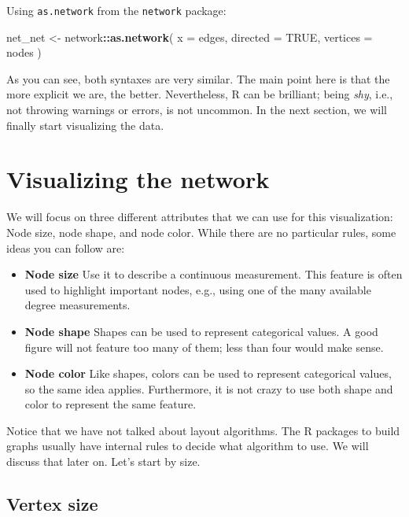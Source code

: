 \documentclass[]{book}
\newenvironment{Shaded}{\begin{snugshade}}{\end{snugshade}}
\newcommand{\DataTypeTok}[1]{\textcolor[rgb]{0.13,0.29,0.53}{#1}}
\newcommand{\KeywordTok}[1]{\textcolor[rgb]{0.13,0.29,0.53}{\textbf{#1}}}
\newcommand{\NormalTok}[1]{#1}
\newcommand{\OperatorTok}[1]{\textcolor[rgb]{0.81,0.36,0.00}{\textbf{#1}}}
\newcommand{\OtherTok}[1]{\textcolor[rgb]{0.56,0.35,0.01}{#1}}
\newcommand{\StringTok}[1]{\textcolor[rgb]{0.31,0.60,0.02}{#1}}
\begin{document}
Using \texttt{as.network} from the \texttt{network} package:

\begin{Shaded}
\begin{Highlighting}[]
\NormalTok{net_net <-}\StringTok{ }\NormalTok{network}\OperatorTok{::}\KeywordTok{as.network}\NormalTok{(}
  \DataTypeTok{x        =}\NormalTok{ edges,}
  \DataTypeTok{directed =} \OtherTok{TRUE}\NormalTok{,}
  \DataTypeTok{vertices =}\NormalTok{ nodes}
\NormalTok{)}
\end{Highlighting}
\end{Shaded}

As you can see, both syntaxes are very similar. The main point here is that the
more explicit we are, the better. Nevertheless, R can be brilliant; being
\emph{shy}, i.e., not throwing warnings or errors, is not uncommon. In the next
section, we will finally start visualizing the data.

\hypertarget{visualizing-the-network}{%
\section{Visualizing the network}\label{visualizing-the-network}}

We will focus on three different attributes that we can use for this visualization:
Node size, node shape, and node color. While there are no particular rules, some
ideas you can follow are:

\begin{itemize}
\item
  \textbf{Node size} Use it to describe a continuous measurement. This feature is often
  used to highlight important nodes, e.g., using one of the many available degree measurements.
\item
  \textbf{Node shape} Shapes can be used to represent categorical values. A good figure
  will not feature too many of them; less than four would make sense.
\item
  \textbf{Node color} Like shapes, colors can be used to represent categorical values, so the
  same idea applies. Furthermore, it is not crazy to use both shape and color to
  represent the same feature.
\end{itemize}

Notice that we have not talked about layout algorithms. The R packages to build
graphs usually have internal rules to decide what algorithm to use. We will discuss that
later on. Let's start by size.

\hypertarget{vertex-size}{%
\subsection{Vertex size}\label{vertex-size}}
\end{document}
